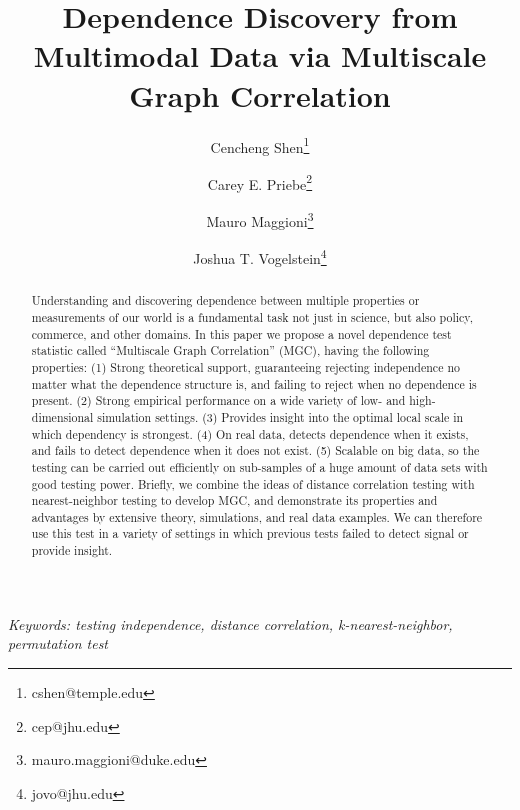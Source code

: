 \documentclass[11pt]{article}
\begin{document}
\def\spacingset#1{\renewcommand{\baselinestretch}%
{#1}\small\normalsize} \spacingset{1}

\title{\bf Dependence Discovery from Multimodal Data via  Multiscale Graph Correlation}
\author[1]{Cencheng Shen\thanks{cshen@temple.edu}}
\author[2]{Carey E. Priebe\thanks{cep@jhu.edu}}
\author[3]{Mauro Maggioni\thanks{mauro.maggioni@duke.edu}}
\author[4]{Joshua T. Vogelstein\thanks{jovo@jhu.edu}}
\maketitle
\pagestyle{empty}

\bigskip
\begin{abstract}
Understanding and discovering dependence between multiple properties or measurements of our world is a fundamental task not just in science, but also policy, commerce, and other domains. 
In this paper we propose a novel dependence test statistic called ``Multiscale Graph Correlation'' (MGC), having the following properties: (1) Strong theoretical support, guaranteeing rejecting independence no matter what the dependence structure is, and failing to reject when no dependence is present. (2) Strong empirical performance on a wide variety of low- and high-dimensional simulation settings. (3) Provides insight into the optimal local scale in which dependency is strongest. (4) On real data, detects dependence when it exists, and fails to detect dependence when it does not exist. (5) Scalable on big data, so the testing can be carried out efficiently on sub-samples of a huge amount of data sets with good testing power.
 Briefly, we combine the ideas of distance correlation testing with nearest-neighbor testing to develop MGC, and demonstrate its properties and advantages by extensive theory, simulations, and real data examples. We can therefore use this test in a variety of settings in which previous tests failed to detect signal or provide insight.
\end{abstract}

\noindent%
{\it Keywords: testing independence, distance correlation, k-nearest-neighbor, permutation test}
\vfill
\end{document}

